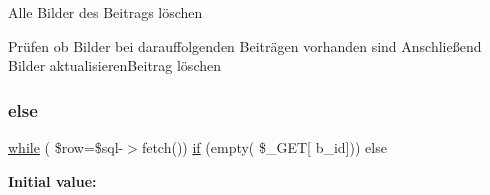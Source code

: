 Alle Bilder des Beitrags löschen

Prüfen ob Bilder bei darauffolgenden Beiträgen vorhanden sind Anschließend Bilder aktualisieren\+Beitrag löschen \mbox{\label{delete_8php_a52ade24bab69d94ccf1510da71182d8f}} 
\subsubsection{\texorpdfstring{else}{else}}
{\footnotesize\ttfamily \mbox{\hyperlink{showpost_8php_a0074fdcf62116989383290ee4de5f453}{while}} ( \$row=\$sql-\/$>$fetch()) \mbox{\hyperlink{view__all_8php_ac0971e25a4f61580752c758ef520f6b2}{if}} (empty( \$\+\_\+\+G\+ET\mbox{[} \textquotesingle{}b\+\_\+id\textquotesingle{}\mbox{]})) else}

{\bfseries Initial value\+:}
\begin{DoxyCode}{0}
\DoxyCodeLine{\{}

\end{DoxyCode}
